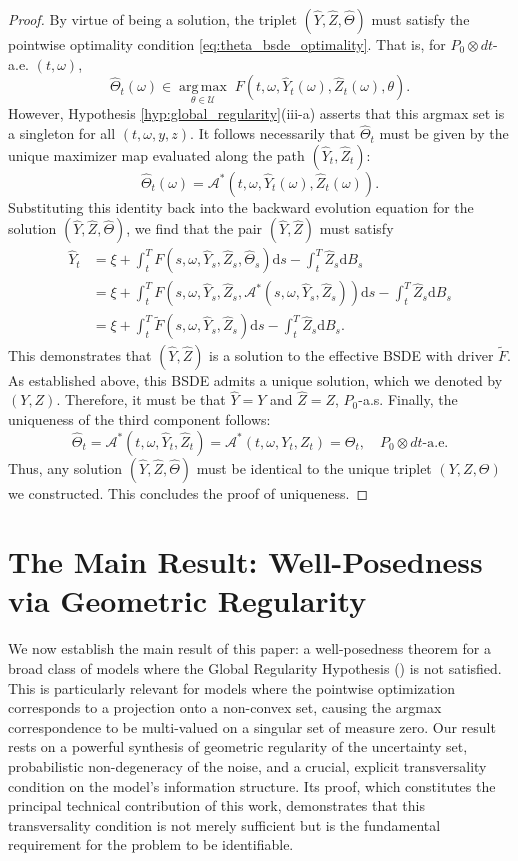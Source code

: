\documentclass[12pt, letterpaper]{amsart}
\newcommand{\Thetacal}{\mathcal{A}}
\newcommand{\Ucal}{\mathcal{U}}
\newcommand{\dd}{\mathrm{d}}
\DeclareMathOperator*{\argmax}{arg\,max}
\theoremstyle{plain}
\theoremstyle{definition}
\theoremstyle{remark}
\numberwithin{equation}{section} %
\begin{document}
\begin{proof}
By virtue of being a solution, the triplet $(\hat{Y}, \hat{Z}, \hat{\Theta})$ must satisfy the pointwise optimality condition \eqref{eq:theta_bsde_optimality}. That is, for $P_0 \otimes dt$-a.e. $(t,\omega)$,
\[ \hat{\Theta}_t(\omega) \in \underset{\theta \in \Ucal}{\argmax} \; F(t, \omega, \hat{Y}_t(\omega), \hat{Z}_t(\omega), \theta). \]
However, Hypothesis \ref{hyp:global_regularity}(iii-a) asserts that this argmax set is a singleton for all $(t,\omega,y,z)$. It follows necessarily that $\hat{\Theta}_t$ must be given by the unique maximizer map evaluated along the path $(\hat{Y}_t, \hat{Z}_t)$:
\[ \hat{\Theta}_t(\omega) = \Thetacal^*(t, \omega, \hat{Y}_t(\omega), \hat{Z}_t(\omega)). \]
Substituting this identity back into the backward evolution equation for the solution $(\hat{Y}, \hat{Z}, \hat{\Theta})$, we find that the pair $(\hat{Y}, \hat{Z})$ must satisfy
\begin{align*}
    \hat{Y}_t &= \xi + \int_t^T F(s, \omega, \hat{Y}_s, \hat{Z}_s, \hat{\Theta}_s) \dd s - \int_t^T \hat{Z}_s \dd B_s \\
    &= \xi + \int_t^T F(s, \omega, \hat{Y}_s, \hat{Z}_s, \Thetacal^*(s,\omega,\hat{Y}_s,\hat{Z}_s)) \dd s - \int_t^T \hat{Z}_s \dd B_s \\
    &= \xi + \int_t^T \tilde{F}(s, \omega, \hat{Y}_s, \hat{Z}_s) \dd s - \int_t^T \hat{Z}_s \dd B_s.
\end{align*}
This demonstrates that $(\hat{Y}, \hat{Z})$ is a solution to the effective BSDE with driver $\tilde{F}$. As established above, this BSDE admits a unique solution, which we denoted by $(Y,Z)$. Therefore, it must be that $\hat{Y} = Y$ and $\hat{Z} = Z$, $P_0$-a.s. Finally, the uniqueness of the third component follows:
\[ \hat{\Theta}_t = \Thetacal^*(t, \omega, \hat{Y}_t, \hat{Z}_t) = \Thetacal^*(t, \omega, Y_t, Z_t) = \Theta_t, \quad P_0 \otimes dt\text{-a.e.} \]
Thus, any solution $(\hat{Y}, \hat{Z}, \hat{\Theta})$ must be identical to the unique triplet $(Y,Z,\Theta)$ we constructed. This concludes the proof of uniqueness.
\end{proof}


\section{The Main Result: Well-Posedness via Geometric Regularity}
\label{sec:main_result_geometric}

We now establish the main result of this paper: a well-posedness theorem for a broad class of models where the Global Regularity Hypothesis () is not satisfied. This is particularly relevant for models where the pointwise optimization corresponds to a projection onto a non-convex set, causing the argmax correspondence to be multi-valued on a singular set of measure zero. Our result rests on a powerful synthesis of geometric regularity of the uncertainty set, probabilistic non-degeneracy of the noise, and a crucial, explicit transversality condition on the model's information structure. Its proof, which constitutes the principal technical contribution of this work, demonstrates that this transversality condition is not merely sufficient but is the fundamental requirement for the problem to be identifiable.
\end{document}
